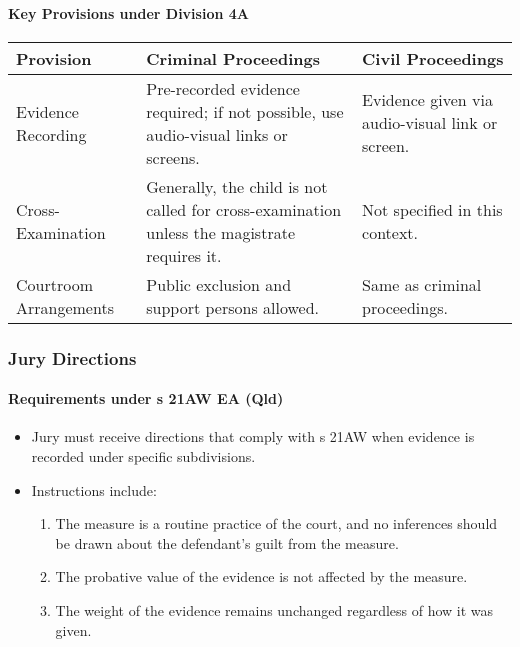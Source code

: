 \paragraph{Key Provisions under Division
4A}\label{key-provisions-under-division-4a}

\begin{longtable}[]{@{}
  >{\raggedright\arraybackslash}p{}
  >{\raggedright\arraybackslash}p{}
  >{\raggedright\arraybackslash}p{}@{}}
\toprule\noalign{}
\begin{minipage}[b]{\linewidth}\raggedright
Provision
\end{minipage} & \begin{minipage}[b]{\linewidth}\raggedright
Criminal Proceedings
\end{minipage} & \begin{minipage}[b]{\linewidth}\raggedright
Civil Proceedings
\end{minipage} \\
\midrule\noalign{}
\endhead
\bottomrule\noalign{}
\endlastfoot
Evidence Recording & Pre-recorded evidence required; if not possible,
use audio-visual links or screens. & Evidence given via audio-visual
link or screen. \\
Cross-Examination & Generally, the child is not called for
cross-examination unless the magistrate requires it. & Not specified in
this context. \\
Courtroom Arrangements & Public exclusion and support persons allowed. &
Same as criminal proceedings. \\
\end{longtable}

\subsubsection{Jury Directions}\label{jury-directions-1}

\paragraph{Requirements under s 21AW EA
(Qld)}\label{requirements-under-s-21aw-ea-qld}

\begin{itemize}
\tightlist
\item
  Jury must receive directions that comply with s 21AW when evidence is
  recorded under specific subdivisions.
\item
  Instructions include:

  \begin{enumerate}
  \def\labelenumi{\arabic{enumi}.}
  \tightlist
  \item
    The measure is a routine practice of the court, and no inferences
    should be drawn about the defendant's guilt from the measure.
  \item
    The probative value of the evidence is not affected by the measure.
  \item
    The weight of the evidence remains unchanged regardless of how it
    was given.
  \end{enumerate}
\end{itemize}

